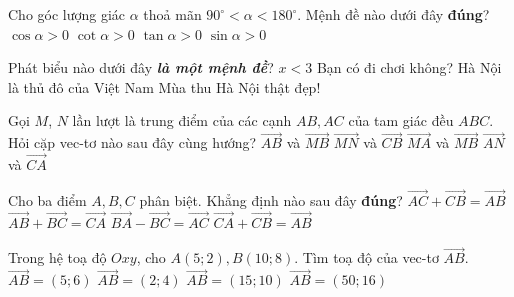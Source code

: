 \begin{ex}%
	Cho góc lượng giác $\alpha$ thoả mãn $90^{\circ}<\alpha<180^{\circ}$. Mệnh đề nào dưới đây \textbf{đúng}?
	\choice
	{$\cos \alpha>0$}
	{$\cot \alpha>0$}
	{$\tan \alpha>0$}
	{\True $\sin \alpha>0$}
\end{ex}
\begin{ex}%
	Phát biểu nào dưới đây \textbf{\textit{là một mệnh đề}}?
	\choice
	{$x<3$}
	{Bạn có đi chơi không?}
	{\True Hà Nội là thủ đô của Việt Nam}
	{Mùa thu Hà Nội thật đẹp!}
\end{ex}
\begin{ex}%
	Gọi $M$, $N$ lần lượt là trung điểm của các cạnh $AB, AC$ của tam giác đều $ABC$. Hỏi cặp vec-tơ nào sau đây cùng hướng?
	\choice
	{\True $\Vec{AB}$ và $\vec{MB}$}
	{$\Vec{MN}$ và $\vec{CB}$}
	{$\Vec{MA}$ và $\vec{MB}$}
	{$\Vec{AN}$ và $\vec{CA}$}
\end{ex}
\begin{ex}%
	Cho ba điểm $A,B,C$ phân biệt. Khẳng định nào sau đây \textbf{đúng}?
	\choice
	{\True $\Vec{AC}+\vec{CB}=\vec{AB}$}
	{$\Vec{AB}+\vec{BC}=\vec{CA}$}
	{$\Vec{BA}-\vec{BC}=\vec{AC}$}
	{$\Vec{CA}+\vec{CB}=\vec{AB}$}
\end{ex}	
\begin{ex}%
	Trong hệ toạ độ $Oxy$, cho $A(5;2), B(10;8)$. Tìm toạ độ của vec-tơ $\vec{AB}$.
	\choice
	{\True$\vec{AB}=(5;6)$}
	{$\Vec{AB}=(2;4)$}
	{$\Vec{AB}=(15;10)$}
	{$\Vec{AB}=(50;16)$}
\end{ex}
